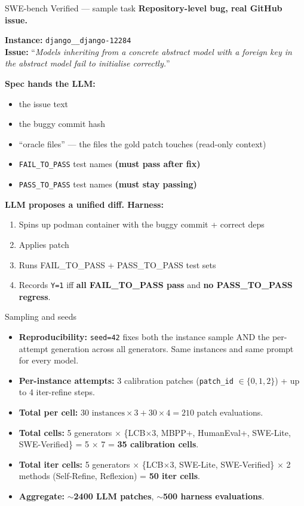 \documentclass[10pt]{beamer}
\newcommand{\good}[1]{\textcolor{accentGreen}{\textbf{#1}}}
\newcommand{\warn}[1]{\textcolor{accentOrange}{\textbf{#1}}}
\newcommand{\info}[1]{\textcolor{primaryBlue}{\textbf{#1}}}
\begin{document}
\begin{frame}[fragile]{SWE-bench Verified --- sample task}
\info{Repository-level bug, real GitHub issue.}

\textcolor{accentGreen}{\textbf{Instance:}} \texttt{django\_\_django-12284}\\
\textcolor{accentGreen}{\textbf{Issue:}} ``\emph{Models inheriting from a
concrete abstract model with a foreign key in the abstract model fail to
initialise correctly.}''

\info{Spec hands the LLM:}
\begin{itemize}
\item the issue text
\item the buggy commit hash
\item ``oracle files'' --- the files the gold patch touches (read-only context)
\item \texttt{FAIL\_TO\_PASS} test names \good{(must pass after fix)}
\item \texttt{PASS\_TO\_PASS} test names \warn{(must stay passing)}
\end{itemize}

\info{LLM proposes a unified diff. Harness:}
\begin{enumerate}
\item Spins up podman container with the buggy commit + correct deps
\item Applies patch
\item Runs FAIL\_TO\_PASS + PASS\_TO\_PASS test sets
\item Records \texttt{Y=1} iff \good{all FAIL\_TO\_PASS pass} and \warn{no
  PASS\_TO\_PASS regress}.
\end{enumerate}
\end{frame}

\begin{frame}{Sampling and seeds}
\vspace{0.2cm}
\begin{itemize}
\item \info{Reproducibility:} \texttt{seed=42} fixes both the instance sample
  AND the per-attempt generation across all generators. Same instances and
  same prompt for every model.
\item \info{Per-instance attempts:} 3 calibration patches
  (\texttt{patch\_id} $\in \{0,1,2\}$) + up to 4 iter-refine steps.
\item \info{Total per cell:}
  $30 \text{ instances} \times 3 + 30 \times 4 = 210$ patch evaluations.
\item \info{Total cells:} 5 generators $\times$ \{LCB$\times$3, MBPP+,
  HumanEval+, SWE-Lite, SWE-Verified\} = 5 $\times$ 7 = \good{35
  calibration cells}.
\item \info{Total iter cells:} 5 generators $\times$ \{LCB$\times$3, SWE-Lite,
  SWE-Verified\} $\times$ 2 methods (Self-Refine, Reflexion) = \good{50 iter
  cells}.
\item \info{Aggregate:} \good{$\sim$2400 LLM patches}, \warn{$\sim$500 harness
  evaluations}.
\end{itemize}
\end{frame}
\end{document}
